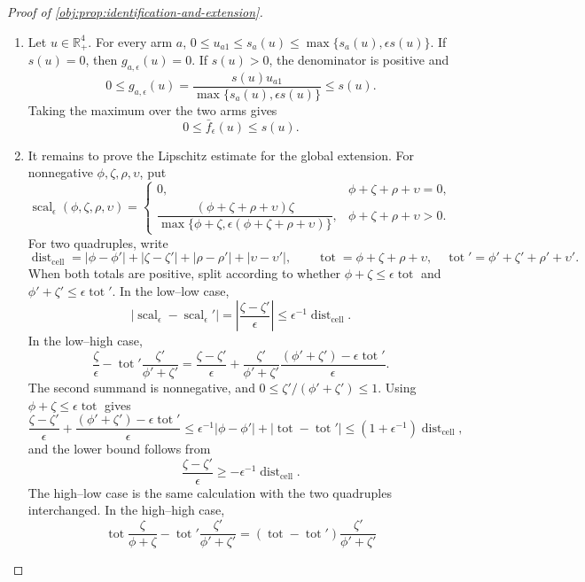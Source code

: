 \begin{proof}[Proof of \cref{obj:prop:identification-and-extension}]
\begin{enumerate}
\item Let \(u\in\mathbb R_+^4\).  For every arm \(a\),
\(0\le u_{a1}\le s_a(u)\le \max\{s_a(u),\epsilon s(u)\}\).  If \(s(u)=0\), then
\(g_{a,\epsilon}(u)=0\).  If \(s(u)>0\), the denominator is positive and
\[
0\le g_{a,\epsilon}(u)
=\frac{s(u)u_{a1}}{\max\{s_a(u),\epsilon s(u)\}}
\le s(u).
\]
Taking the maximum over the two arms gives
\[
0\le \bar f_\epsilon(u)\le s(u).
\] %

\item It remains to prove the Lipschitz estimate for the global extension.  For nonnegative
\(\phi,\zeta,\rho,\upsilon\), put
\[
\operatorname{scal}_{\epsilon}(\phi,\zeta,\rho,\upsilon)=
\begin{cases}
0, & \phi+\zeta+\rho+\upsilon=0,\\[2mm]
\dfrac{(\phi+\zeta+\rho+\upsilon)\zeta}
{\max\{\phi+\zeta,\epsilon(\phi+\zeta+\rho+\upsilon)\}},
& \phi+\zeta+\rho+\upsilon>0 .
\end{cases}
\]
For two quadruples, write
\[
\operatorname{dist}_{\mathrm{cell}}
=
|\phi-\phi'|+|\zeta-\zeta'|+|\rho-\rho'|+|\upsilon-\upsilon'|,
\qquad
\operatorname{tot}=\phi+\zeta+\rho+\upsilon,
\quad
\operatorname{tot}'=\phi'+\zeta'+\rho'+\upsilon'.
\]
When both totals are positive, split according to whether
\(\phi+\zeta\le \epsilon\operatorname{tot}\) and
\(\phi'+\zeta'\le \epsilon\operatorname{tot}'\).  In the low--low case,
\[
|\operatorname{scal}_{\epsilon}-\operatorname{scal}_{\epsilon}'|
=\left|\frac{\zeta-\zeta'}{\epsilon}\right|
\le \epsilon^{-1}\operatorname{dist}_{\mathrm{cell}}.
\]
In the low--high case,
\[
\frac{\zeta}{\epsilon}
-\operatorname{tot}'\frac{\zeta'}{\phi'+\zeta'}
=
\frac{\zeta-\zeta'}{\epsilon}
+\frac{\zeta'}{\phi'+\zeta'}
  \frac{(\phi'+\zeta')-\epsilon\operatorname{tot}'}{\epsilon}.
\]
The second summand is nonnegative, and \(0\le \zeta'/(\phi'+\zeta')\le 1\).  Using
\(\phi+\zeta\le \epsilon\operatorname{tot}\) gives
\[
\frac{\zeta-\zeta'}{\epsilon}
+\frac{(\phi'+\zeta')-\epsilon\operatorname{tot}'}{\epsilon}
\le
\epsilon^{-1}|\phi-\phi'|+|\operatorname{tot}-\operatorname{tot}'|
\le (1+\epsilon^{-1})\operatorname{dist}_{\mathrm{cell}},
\]
and the lower bound follows from
\[
\frac{\zeta-\zeta'}{\epsilon}\ge
-\epsilon^{-1}\operatorname{dist}_{\mathrm{cell}}.
\]
The high--low case is the same calculation with the two quadruples interchanged.  In the high--high
case,
\[
\operatorname{tot}\frac{\zeta}{\phi+\zeta}
-\operatorname{tot}'\frac{\zeta'}{\phi'+\zeta'}
=
(\operatorname{tot}-\operatorname{tot}')\frac{\zeta'}{\phi'+\zeta'}
\]
\end{enumerate}
\end{proof}
